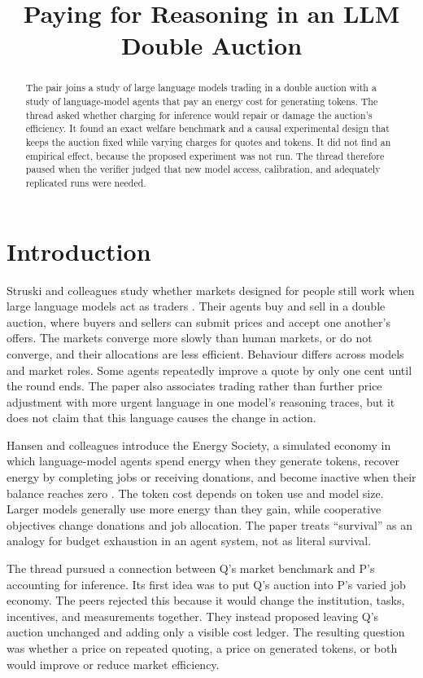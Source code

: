 \documentclass{article}
\title{Paying for Reasoning in an LLM Double Auction}
\author{}
\date{}
\begin{document}
\maketitle

\begin{abstract}
The pair joins a study of large language models trading in a double auction with a study of language-model agents that pay an energy cost for generating tokens.  The thread asked whether charging for inference would repair or damage the auction's efficiency.  It found an exact welfare benchmark and a causal experimental design that keeps the auction fixed while varying charges for quotes and tokens.  It did not find an empirical effect, because the proposed experiment was not run.  The thread therefore paused when the verifier judged that new model access, calibration, and adequately replicated runs were needed.
\end{abstract}

\section{Introduction}

Struski and colleagues study whether markets designed for people still work when large language models act as traders \cite{struski2026competitive}.  Their agents buy and sell in a double auction, where buyers and sellers can submit prices and accept one another's offers.  The markets converge more slowly than human markets, or do not converge, and their allocations are less efficient.  Behaviour differs across models and market roles.  Some agents repeatedly improve a quote by only one cent until the round ends.  The paper also associates trading rather than further price adjustment with more urgent language in one model's reasoning traces, but it does not claim that this language causes the change in action.

Hansen and colleagues introduce the Energy Society, a simulated economy in which language-model agents spend energy when they generate tokens, recover energy by completing jobs or receiving donations, and become inactive when their balance reaches zero \cite{hansen2026energy}.  The token cost depends on token use and model size.  Larger models generally use more energy than they gain, while cooperative objectives change donations and job allocation.  The paper treats ``survival'' as an analogy for budget exhaustion in an agent system, not as literal survival.

The thread pursued a connection between Q's market benchmark and P's accounting for inference.  Its first idea was to put Q's auction into P's varied job economy.  The peers rejected this because it would change the institution, tasks, incentives, and measurements together.  They instead proposed leaving Q's auction unchanged and adding only a visible cost ledger.  The resulting question was whether a price on repeated quoting, a price on generated tokens, or both would improve or reduce market efficiency.
\end{document}
